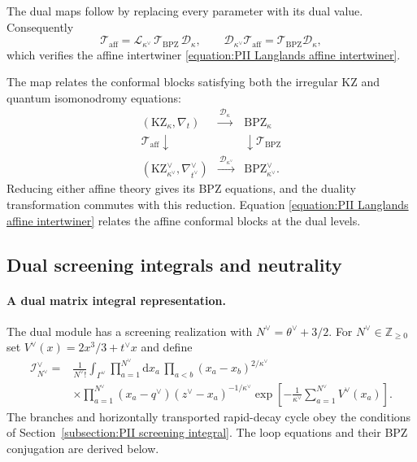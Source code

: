 \documentclass[a4paper,11pt]{article}
\newcommand{\cT}{\mathcal{T}}
\newcommand{\dd}{\mathrm{d}}
\numberwithin{equation}{section}
\begin{document}
The dual maps follow by replacing every parameter with its dual value.
Consequently
\begin{equation}
	\cT_{\mathrm{aff}}
	=\mathscr{L}_{\kappa^{\vee}}\,
	\cT_{\mathrm{BPZ}}\,\mathscr{D}_{\kappa},
	\qquad
	\mathscr{D}_{\kappa^{\vee}}\cT_{\mathrm{aff}}
	=\cT_{\mathrm{BPZ}}\mathscr{D}_{\kappa},
\end{equation}
which verifies the affine intertwiner
\eqref{equation:PII Langlands affine intertwiner}.


The map relates the conformal blocks satisfying both the irregular KZ
and quantum isomonodromy equations:
\begin{equation}
	\begin{array}{ccc}
		(\mathrm{KZ}_{\kappa},\nabla_{t})
		&\xrightarrow{\ \mathscr{D}_{\kappa}\ }&
		\mathrm{BPZ}_{\kappa}\\
		{\scriptstyle\cT_{\mathrm{aff}}}\downarrow
		&&\downarrow{\scriptstyle\cT_{\mathrm{BPZ}}}\\
		(\mathrm{KZ}_{\kappa^{\vee}}^{\vee},\nabla_{t^{\vee}}^{\vee})
		&\xrightarrow{\ \mathscr{D}_{\kappa^{\vee}}\ }&
		\mathrm{BPZ}_{\kappa^{\vee}}^{\vee}.
	\end{array}
\end{equation}
Reducing either affine theory gives its BPZ equations, and the
duality transformation commutes with this reduction.  Equation
\eqref{equation:PII Langlands affine intertwiner} relates the affine
conformal blocks at the dual levels.

\subsection{Dual screening integrals and neutrality}
\label{subsection:PII dual screening representation}

\paragraph*{A dual matrix integral representation.}
The dual module has a screening realization with
$N^{\vee}=\theta^{\vee}+3/2$.  For $N^{\vee}\in\mathbb{Z}_{\geq0}$ set
$V^{\vee}(x)=2x^{3}/3+t^{\vee}x$ and define
\begin{equation}
	\label{equation:PII dual screening integral}
	\begin{aligned}
		\mathcal{I}_{N^{\vee}}^{\vee}
		={}&\frac{1}{N^{\vee}!}\int_{\Gamma^{\vee}}
		\prod_{a=1}^{N^{\vee}}\dd x_{a}\,
		\prod_{a<b}(x_{a}-x_{b})^{2/\kappa^{\vee}}\\
		&\times\prod_{a=1}^{N^{\vee}}
		(x_{a}-q^{\vee})(z^{\vee}-x_{a})^{-1/\kappa^{\vee}}
		\exp\left[-\frac{1}{\kappa^{\vee}}
		\sum_{a=1}^{N^{\vee}}V^{\vee}(x_{a})\right].
	\end{aligned}
\end{equation}
The branches and horizontally transported rapid-decay cycle obey
the conditions of Section~\ref{subsection:PII screening integral}.
The loop equations and their BPZ conjugation are derived below.
\end{document}
